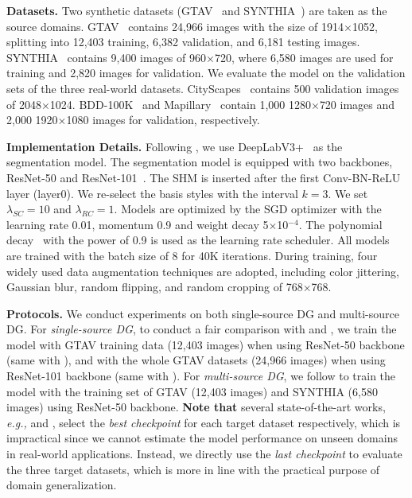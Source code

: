 \documentclass[runningheads]{llncs}
\begin{document}
\noindent\textbf{Datasets.}
Two synthetic datasets (GTAV~\cite{gtav} and SYNTHIA~\cite{synthia}) are taken as the source domains.
GTAV~\cite{gtav} contains 24,966 images with the size of 1914$\times$1052, splitting into 12,403 training, 6,382 validation, and 6,181 testing images. SYNTHIA~\cite{synthia} contains 9,400 images of 960$\times$720, where 6,580 images are used for training and 2,820 images for validation.
We evaluate the model on the validation sets of the three real-world datasets. CityScapes~\cite{cityscapes} contains 500 validation images of 2048$\times$1024. BDD-100K~\cite{bdd} and Mapillary~\cite{mapillary} contain 1,000 1280$\times$720 images and 2,000 1920$\times$1080 images for validation, respectively.

\noindent\textbf{Implementation Details.} Following \cite{robustnet}, we use DeepLabV3+~\cite{deeplab} as the segmentation model. The segmentation model is equipped with two backbones, ResNet-50 and ResNet-101~\cite{he2016deep}. The SHM is inserted after the first Conv-BN-ReLU layer (layer0). We re-select the basis styles with the interval $k=3$. We set $\lambda_{SC}=10$ and $\lambda_{RC}=1$.
Models are optimized by the SGD optimizer with the learning rate 0.01, momentum 0.9 and weight decay 5$\times$10$^{-4}$. The polynomial decay~\cite{liu2015parsenet} with the power of 0.9 is used as the learning rate scheduler. All models are trained with the batch size of 8 for 40K iterations. 
During training, four widely used data augmentation techniques are adopted, including color jittering, Gaussian blur, random flipping, and random cropping of 768$\times$768. 


\noindent\textbf{Protocols.} We conduct experiments on both single-source DG and multi-source DG. For \textit{single-source DG}, to conduct a fair comparison with \cite{robustnet} and \cite{FSDR}, we train the model with GTAV training data (12,403 images) when using ResNet-50 backbone (same with \cite{robustnet}), and with the whole GTAV datasets (24,966 images) when using ResNet-101 backbone (same with \cite{FSDR}). For \textit{multi-source DG}, we follow \cite{robustnet} to train the model with the training set of GTAV (12,403 images) and SYNTHIA (6,580 images) using ResNet-50 backbone.
\textbf{Note that} several state-of-the-art works, \textit{e.g.,} \cite{FSDR} and \cite{DRPC}, select the \textit{best checkpoint} for each target dataset respectively, which is impractical since we cannot estimate the model performance on unseen domains in real-world applications. Instead, we directly use the \textit{last checkpoint} to evaluate the three target datasets, which is more in line with the practical purpose of domain generalization.
\end{document}
